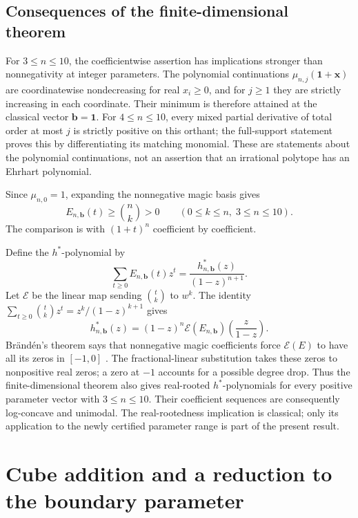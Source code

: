 \documentclass[11pt]{article}
\theoremstyle{definition}
\newcommand{\bb}{\mathbf b}
\newcommand{\xx}{\mathbf x}
\newcommand{\one}{\mathbf 1}
\numberwithin{equation}{section}
\begin{document}
\subsection{Consequences of the finite-dimensional theorem}
For $3\le n\le10$, the coefficientwise assertion has implications stronger
than nonnegativity at integer parameters. The polynomial continuations
$\mu_{n,j}(\one+\xx)$ are coordinatewise nondecreasing for real $x_i\ge0$,
and for $j\ge1$ they are strictly increasing in each coordinate. Their
minimum is therefore attained at the classical vector $\bb=\one$.
For $4\le n\le10$, every mixed partial derivative of total order at most $j$
is strictly positive on this orthant; the full-support statement proves
this by differentiating its matching monomial. These are statements about
the polynomial continuations, not an assertion that an irrational polytope
has an Ehrhart polynomial.

Since $\mu_{n,0}=1$, expanding the nonnegative magic basis gives
\begin{equation}
 [t^k]E_{n,\bb}(t)\ge\binom nk>0
 \qquad(0\le k\le n,\;3\le n\le10).
 \label{eq:ordinary-lower}
\end{equation}
The comparison is with $(1+t)^n$ coefficient by coefficient.

Define the $h^*$-polynomial by
\[
 \sum_{t\ge0}E_{n,\bb}(t)z^t=\frac{h^*_{n,\bb}(z)}{(1-z)^{n+1}}.
\]
Let $\mathcal E$ be the linear map sending $\binom tk$ to $w^k$.
The identity $\sum_{t\ge0}\binom tkz^t=z^k/(1-z)^{k+1}$ gives
\[
 h^*_{n,\bb}(z)=(1-z)^n
       \mathcal E(E_{n,\bb})\!\left(\frac{z}{1-z}\right).
\]
Br\"and\'en's theorem says that nonnegative magic coefficients force
$\mathcal E(E)$ to have all its zeros in $[-1,0]$
\cite[Theorem~4.2 and equation~(6.4)]{Branden}. The fractional-linear
substitution takes these zeros to nonpositive real zeros; a zero at $-1$
accounts for a possible degree drop. Thus the finite-dimensional theorem
also gives real-rooted $h^*$-polynomials for every positive parameter vector
with $3\le n\le10$. Their coefficient sequences are consequently
log-concave and unimodal. The real-rootedness implication is classical;
only its application to the newly certified parameter range is part of
the present result.

\section{Cube addition and a reduction to the boundary parameter}
\label{sec:cube}
\end{document}
